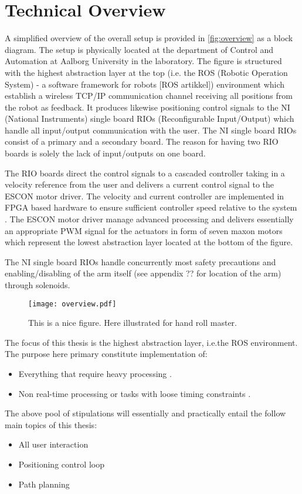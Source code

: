 \section{Technical Overview}
A simplified overview of the overall setup is provided in \autoref{fig:overview} as a block diagram. The setup is physically located at the department of Control and Automation at Aalborg University in the laboratory. The figure is structured with the highest abstraction layer at the top (i.e. the ROS (Robotic Operation System) - a software framework for robots [ROS artikkel]) environment which establish a wireless TCP/IP communication channel receiving all positions from the robot as feedback. It produces likewise positioning control signals to the NI (National Instruments) single board RIOs (Reconfigurable Input/Output) which handle all input/output communication with the user. The NI single board RIOs consist of a primary and a secondary board. The reason for having two RIO boards is solely the lack of input/outputs on one board.

The RIO boards direct the control signals to a cascaded controller taking in a velocity reference from the user and delivers a current control signal to the ESCON motor driver. The velocity and current controller are implemented in FPGA based hardware to ensure sufficient controller speed relative to the system \citep{bib:robot_paper}. The ESCON motor driver manage advanced processing and delivers essentially an appropriate PWM signal for the  actuators in form of seven maxon motors which represent the lowest abstraction layer located at the bottom of the figure.

The NI single board RIOs handle concurrently most safety precautions and enabling/disabling of the arm itself (see appendix ?? for location of the arm) through solenoids.
\begin{figure}[H]
	\center
	\texttt{[image: overview.pdf]}	\caption{This is a nice figure. Here illustrated for hand roll master.}
	\label{fig:overview}
\end{figure}
The focus of this thesis is the highest abstraction layer, i.e.the ROS environment. The purpose here primary constitute implementation of:
\begin{itemize}
\item Everything that require heavy processing \citep{bib:robot_paper}.
\item Non real-time processing or tasks with loose timing constraints \citep{bib:robot_paper}.
\end{itemize}
The above pool of stipulations will essentially and practically entail the follow main topics of this thesis:
\begin{itemize}
\item All user interaction
\item Positioning control loop
\item Path planning
\end{itemize}